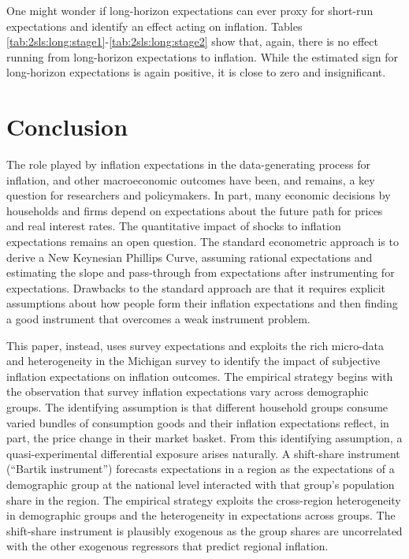 \documentclass[12pt]{article}
\begin{document}



One might wonder if long-horizon expectations can ever proxy for short-run expectations and identify an effect acting on inflation. Tables \ref{tab:2sls:long:stage1}-\ref{tab:2sls:long:stage2} show that, again, there is no effect running from long-horizon expectations to inflation. While the estimated sign for long-horizon expectations is again positive, it is close to zero and insignificant.  



 
\section{Conclusion}


The role played by inflation expectations in the data-generating process for inflation, and other macroeconomic outcomes have been, and remains, a key question for researchers and policymakers. In part, many economic decisions by households and firms depend on expectations about the future path for prices and real interest rates. The quantitative impact of shocks to inflation expectations remains an open question. The standard econometric approach is to derive a New Keynesian Phillips Curve, assuming rational expectations and estimating the slope and pass-through from expectations after instrumenting for expectations. Drawbacks to the standard approach are that it requires explicit assumptions about how people form their inflation expectations and then finding a good instrument that overcomes a weak instrument problem.

This paper, instead, uses survey expectations and exploits the rich micro-data and heterogeneity in the Michigan survey to identify the impact of subjective inflation expectations on inflation outcomes. The empirical strategy begins with the observation that survey inflation expectations vary across demographic groups. The identifying assumption is that different household groups consume varied bundles of consumption goods and their inflation expectations reflect, in part, the price change in their market basket. From this identifying assumption, a quasi-experimental differential exposure arises naturally. A shift-share instrument (``Bartik instrument'') forecasts expectations in a region as the expectations of a demographic group at the national level interacted with that group's population share in the region. The empirical strategy exploits the cross-region heterogeneity in demographic groups and the heterogeneity in expectations across groups. The shift-share instrument is plausibly exogenous as the group shares are uncorrelated with the other exogenous regressors that predict regional inflation.
\end{document}

